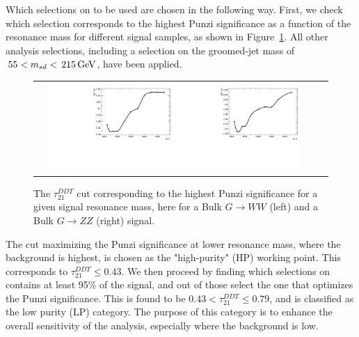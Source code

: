 Which selections on \ddt to be used are chosen in the following way. First, we check which \ddt selection corresponds to the highest Punzi significance as a function of the resonance mass for different signal samples, as shown in Figure~\ref{fig:punzi}. All other analysis selections, including a selection on the groomed-jet mass of $\text{\,55} < m_{sd} < \text{\,215}{\ensuremath{\,\text{Ge\hspace{-.08em}V}}}$, have been applied.
\begin{figure}[h!]
\centering
\begin{tabular}{cc}
\includegraphics[width=0.45\textwidth]{figures/analysis/search3/AN-17-303/vtag/tau21ddt_punzi_BulkGravToZZToZhadZhad.pdf}
\includegraphics[width=0.45\textwidth]{figures/analysis/search3/AN-17-303/vtag/tau21ddt_punzi_BulkGravToWW.pdf}
\end{tabular}
\caption{The $\tau_{21}^{DDT}$ cut corresponding to the highest Punzi significance for a given signal resonance mass, here for a Bulk $G\rightarrow WW$ (left) and a Bulk $G\rightarrow ZZ$ (right) signal.}
\label{fig:punzi}
\end{figure}
The cut maximizing the Punzi significance at lower resonance mass, where the background is highest, is chosen as the "high-purity" (HP) working point.
This corresponds to $\tau_{21}^{DDT} \leq 0.43$. We then proceed by finding which selections on \ddt contains at least 95\% of the signal, and out of those select the one that optimizes the Punzi significance. This is found to be $0.43<\tau_{21}^{DDT}\leq0.79$, and is classified as the low purity (LP) category. The purpose of this category is to enhance the overall sensitivity of the analysis, especially where the background is low.\par

